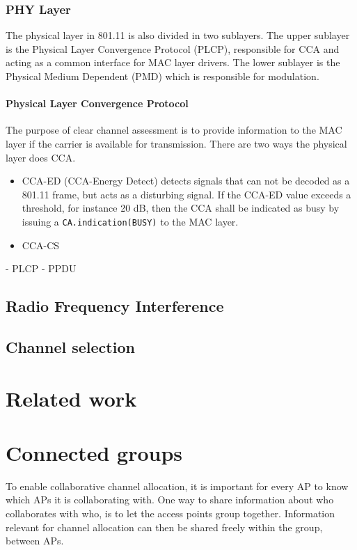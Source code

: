 \documentclass[a4paper,UKenglish]{report}
\begin{document}
\subsection{PHY Layer}
The physical layer in 801.11 is also divided in two sublayers. The upper sublayer is the Physical Layer Convergence Protocol (PLCP), responsible for CCA and acting
as a common interface for MAC layer drivers. The lower sublayer is the Physical Medium Dependent (PMD) which is responsible for modulation. 


\subsubsection{Physical Layer Convergence Protocol}
The purpose of clear channel assessment is to provide information to the MAC layer if the carrier is available for transmission. There
are two ways the physical layer does CCA.
\begin{itemize}
	\item CCA-ED (CCA-Energy Detect) detects signals that can not be decoded as a 801.11 frame, but acts as a disturbing signal. If the CCA-ED value 
		exceeds a threshold, for instance 20 dB, then the CCA shall be indicated as busy by issuing a \verb|CA.indication(BUSY)| to the MAC layer.  
	\item CCA-CS
\end{itemize}

- PLCP
- PPDU

\section{Radio Frequency Interference}



\section{Channel selection} 


\chapter{Related work}

\chapter{Connected groups}
To enable collaborative channel allocation, it is important for every AP to know which APs it is collaborating with.
One way to share information about who collaborates with who, is to let the access points group together. Information relevant for channel
allocation can then be shared freely within the group, between APs.
\end{document}
